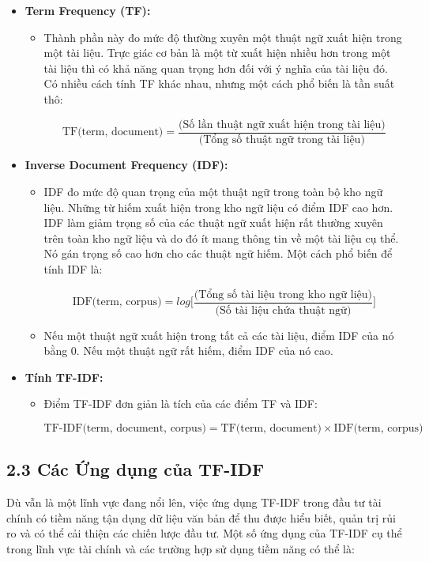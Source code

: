 \begin{itemize}
  \item \textbf{Term Frequency (TF):}
  \begin{itemize}
    \item Thành phần này đo mức độ thường xuyên một thuật ngữ xuất hiện trong một tài liệu. Trực giác cơ bản là một từ xuất hiện nhiều hơn trong một tài liệu thì có khả năng quan trọng hơn đối với ý nghĩa của tài liệu đó. Có nhiều cách tính TF khác nhau, nhưng một cách phổ biến là tần suất thô:

    $$\text{TF(term, document)} = \frac{ \text{(Số lần thuật ngữ xuất hiện trong tài liệu)}}{\text{(Tổng số thuật ngữ trong tài liệu)}}$$
  \end{itemize}
  \item \textbf{Inverse Document Frequency (IDF):}
  \begin{itemize}
    \item IDF đo mức độ quan trọng của một thuật ngữ trong toàn bộ kho ngữ liệu. Những từ hiếm xuất hiện trong kho ngữ liệu có điểm IDF cao hơn. IDF làm giảm trọng số của các thuật ngữ xuất hiện rất thường xuyên trên toàn kho ngữ liệu và do đó ít mang thông tin về một tài liệu cụ thể. Nó gán trọng số cao hơn cho các thuật ngữ hiếm. Một cách phổ biến để tính IDF là:

    $$\text{IDF(term, corpus)} = log \Big[ \frac{\text{(Tổng số tài liệu trong kho ngữ liệu)}}{\text{(Số tài liệu chứa thuật ngữ)}} \Big]$$

    \item Nếu một thuật ngữ xuất hiện trong tất cả các tài liệu, điểm IDF của nó bằng 0. Nếu một thuật ngữ rất hiếm, điểm IDF của nó cao.
  \end{itemize}
  \item \textbf{Tính TF-IDF:}
  \begin{itemize}
    \item Điểm TF-IDF đơn giản là tích của các điểm TF và IDF:

    $$\text{TF-IDF(term, document, corpus)} = \text{TF(term, document)} \times \text{IDF(term, corpus)}$$
  \end{itemize}
\end{itemize}

\subsection{2.3 Các Ứng dụng của TF-IDF}

Dù vẫn là một lĩnh vực đang nổi lên, việc ứng dụng TF-IDF trong đầu tư tài chính có tiềm năng tận dụng dữ liệu văn bản để thu được hiểu biết, quản trị rủi ro và có thể cải thiện các chiến lược đầu tư. Một số ứng dụng của TF-IDF cụ thể trong lĩnh vực tài chính và các trường hợp sử dụng tiềm năng có thể là:

